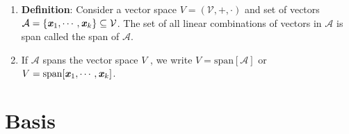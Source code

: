 \begin{enumerate}
    \item \textbf{Definition}: Consider a vector space $V = (\mathcal{V}, +, \cdot)$ and set of vectors $\mathcal{A} = \left\{\text{\textbf{\textit{x}}}_1, \cdots , \text{\textbf{\textit{x}}}_k\right\} \subseteq \mathcal{V}$. 
    The set of all linear combinations of vectors in $\mathcal{A}$ is span called the span of $\mathcal{A}$.
    \hfill \cite{mfml/book/mml/Deisenroth-Faisal-Ong}

    \item If $\mathcal{A}$ spans the vector space $V$ , we write $V = \text{span}[\mathcal{A}]$ or $V = \text{span}[\text{\textbf{\textit{x}}}_1, \cdots , \text{\textbf{\textit{x}}}_k]$.
    \hfill \cite{mfml/book/mml/Deisenroth-Faisal-Ong}
\end{enumerate}





\section{Basis}

